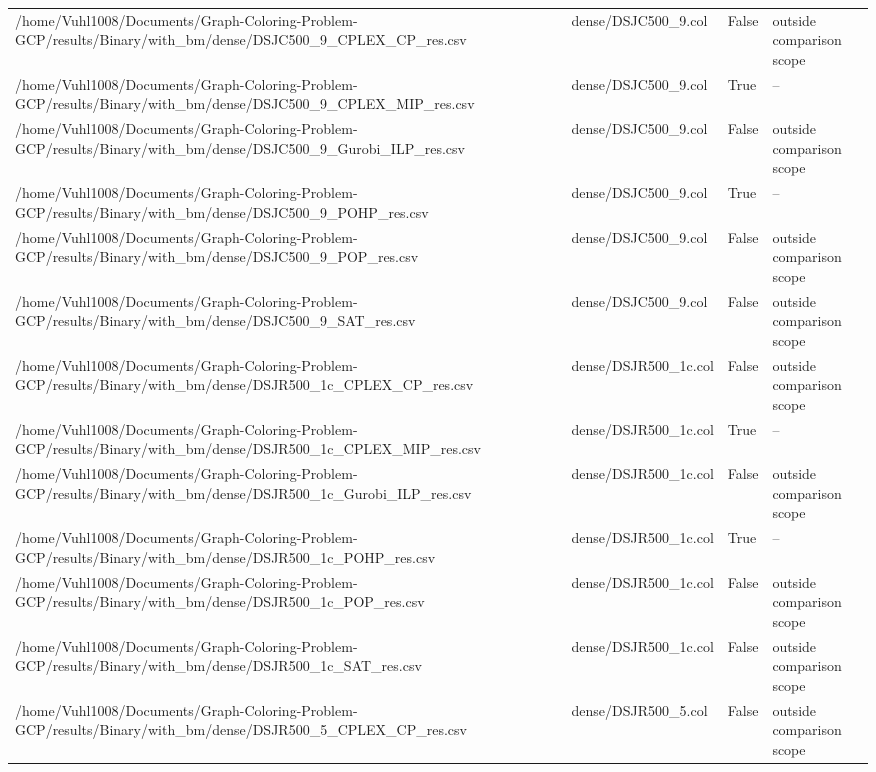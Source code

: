 \begin{table}[htbp]
\begin{tabular}{llll}
/home/Vuhl1008/Documents/Graph-Coloring-Problem-GCP/results/Binary/with\_bm/dense/DSJC500\_9\_CPLEX\_CP\_res.csv & dense/DSJC500\_9.col & False & outside comparison scope \\
/home/Vuhl1008/Documents/Graph-Coloring-Problem-GCP/results/Binary/with\_bm/dense/DSJC500\_9\_CPLEX\_MIP\_res.csv & dense/DSJC500\_9.col & True & -- \\
/home/Vuhl1008/Documents/Graph-Coloring-Problem-GCP/results/Binary/with\_bm/dense/DSJC500\_9\_Gurobi\_ILP\_res.csv & dense/DSJC500\_9.col & False & outside comparison scope \\
/home/Vuhl1008/Documents/Graph-Coloring-Problem-GCP/results/Binary/with\_bm/dense/DSJC500\_9\_POHP\_res.csv & dense/DSJC500\_9.col & True & -- \\
/home/Vuhl1008/Documents/Graph-Coloring-Problem-GCP/results/Binary/with\_bm/dense/DSJC500\_9\_POP\_res.csv & dense/DSJC500\_9.col & False & outside comparison scope \\
/home/Vuhl1008/Documents/Graph-Coloring-Problem-GCP/results/Binary/with\_bm/dense/DSJC500\_9\_SAT\_res.csv & dense/DSJC500\_9.col & False & outside comparison scope \\
/home/Vuhl1008/Documents/Graph-Coloring-Problem-GCP/results/Binary/with\_bm/dense/DSJR500\_1c\_CPLEX\_CP\_res.csv & dense/DSJR500\_1c.col & False & outside comparison scope \\
/home/Vuhl1008/Documents/Graph-Coloring-Problem-GCP/results/Binary/with\_bm/dense/DSJR500\_1c\_CPLEX\_MIP\_res.csv & dense/DSJR500\_1c.col & True & -- \\
/home/Vuhl1008/Documents/Graph-Coloring-Problem-GCP/results/Binary/with\_bm/dense/DSJR500\_1c\_Gurobi\_ILP\_res.csv & dense/DSJR500\_1c.col & False & outside comparison scope \\
/home/Vuhl1008/Documents/Graph-Coloring-Problem-GCP/results/Binary/with\_bm/dense/DSJR500\_1c\_POHP\_res.csv & dense/DSJR500\_1c.col & True & -- \\
/home/Vuhl1008/Documents/Graph-Coloring-Problem-GCP/results/Binary/with\_bm/dense/DSJR500\_1c\_POP\_res.csv & dense/DSJR500\_1c.col & False & outside comparison scope \\
/home/Vuhl1008/Documents/Graph-Coloring-Problem-GCP/results/Binary/with\_bm/dense/DSJR500\_1c\_SAT\_res.csv & dense/DSJR500\_1c.col & False & outside comparison scope \\
/home/Vuhl1008/Documents/Graph-Coloring-Problem-GCP/results/Binary/with\_bm/dense/DSJR500\_5\_CPLEX\_CP\_res.csv & dense/DSJR500\_5.col & False & outside comparison scope \\

\end{tabular}
\end{table}
